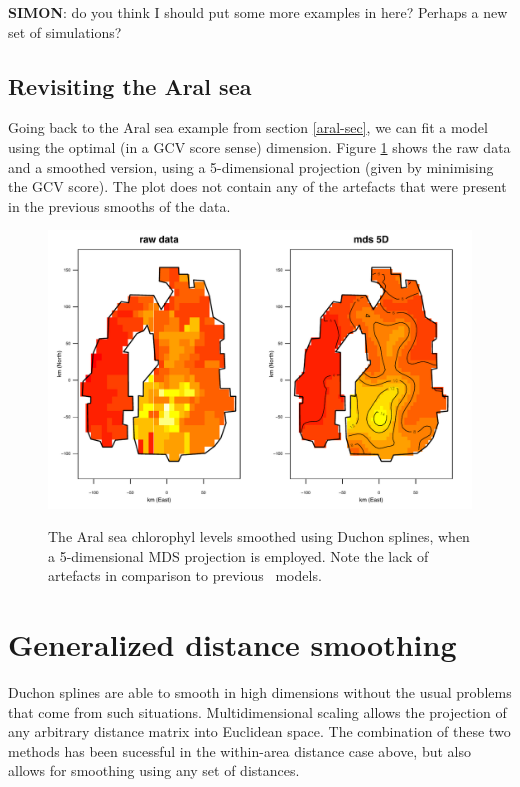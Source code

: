 \textbf{SIMON}: do you think I should put some more examples in here? Perhaps a new set of simulations?


\subsection{Revisiting the Aral sea}

Going back to the Aral sea example from section \ref{aral-sec}, we can fit a model using the optimal (in a GCV score sense) dimension. Figure \ref{mds-aral-5d-duchon} shows the raw data and a smoothed version, using a 5-dimensional projection (given by minimising the GCV score). The plot does not contain any of the artefacts that were present in the previous smooths of the data.

\begin{figure}
\centering
\includegraphics[width=6in]{mds/figs/aral-5d-duchon.pdf} \\
\caption{The Aral sea chlorophyl levels smoothed using Duchon splines, when a 5-dimensional MDS projection is employed. Note the lack of artefacts in comparison to previous \mdsap\ models.}
\label{mds-aral-5d-duchon}
\end{figure}



\section{Generalized distance smoothing}
\label{gds-gds-examples}

Duchon splines are able to smooth in high dimensions without the usual problems that come from such situations. Multidimensional scaling allows the projection of any arbitrary distance matrix into Euclidean space. The combination of these two methods has been sucessful in the within-area distance case above, but also allows for smoothing using any set of distances.

